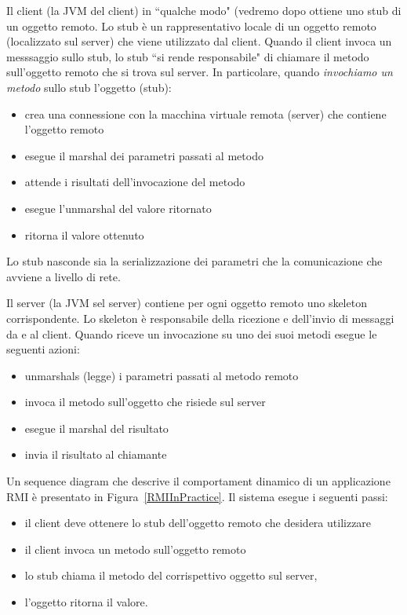 \documentclass{article}
\begin{document}
Il client (la JVM del client) in ``qualche modo" (vedremo dopo ottiene uno stub di un oggetto remoto. Lo stub  \`e un rappresentativo locale di un oggetto remoto (localizzato sul server) che viene utilizzato dal client. Quando il client invoca un messsaggio sullo stub, lo stub ``si rende responsabile" di chiamare il metodo sull'oggetto remoto che si trova sul server.  In particolare, quando \emph{invochiamo un metodo} sullo stub l'oggetto (stub):
\begin{itemize}
\item crea una connessione con la macchina virtuale remota (server) che contiene l'oggetto remoto
\item esegue il marshal dei parametri passati al metodo
\item attende i risultati dell'invocazione del metodo
\item esegue l'unmarshal del valore ritornato
\item ritorna il valore ottenuto
\end{itemize}
Lo stub nasconde sia la serializzazione dei parametri che la comunicazione che avviene a livello di rete.

Il server (la JVM sel server) contiene per ogni oggetto remoto uno skeleton corrispondente. Lo skeleton \`e responsabile della ricezione e dell'invio di messaggi da e al client. Quando riceve un invocazione su uno dei suoi metodi esegue le seguenti azioni:
\begin{itemize}
\item unmarshals (legge) i parametri passati al metodo remoto
\item invoca il metodo sull'oggetto che risiede sul server
\item esegue il marshal del risultato
\item invia il risultato al chiamante
\end{itemize}

Un sequence diagram che descrive il comportament dinamico di un applicazione RMI \`e presentato in Figura~\ref{RMIInPractice}. Il sistema esegue i seguenti passi:

\begin{itemize}
\item il client deve ottenere lo stub dell'oggetto remoto che desidera utilizzare
\item il client invoca un metodo sull'oggetto remoto
\item lo stub chiama il metodo del corrispettivo oggetto sul server,
\item l'oggetto ritorna il valore.
\end{itemize}
\end{document}
